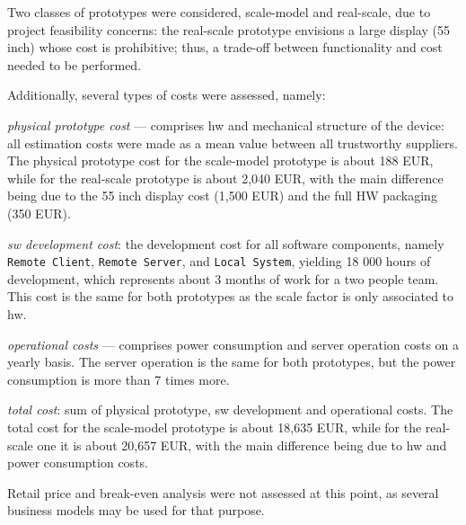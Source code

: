 Two classes of prototypes were considered, scale-model and real-scale,
due to project feasibility concerns: the real-scale prototype envisions a large
display (55 inch) whose cost is prohibitive; thus, a trade-off between
functionality and cost needed to be performed.

Additionally, several types of costs were assessed, namely:
\begin{item-c}
\item \emph{physical prototype cost} --- comprises \gls{hw} and mechanical structure of
  the device: all estimation costs were made as a mean value between all
  trustworthy suppliers.
The physical prototype cost for the scale-model prototype is about 188 EUR,
while for the real-scale prototype is about 2,040 EUR, with the main difference
being due to the 55 inch display cost (1,500 EUR) and the full HW packaging (350 EUR).
\item \emph{\gls{sw} development cost}: the development cost for all software
  components, namely \texttt{Remote Client}, \texttt{Remote Server}, and
  \texttt{Local System}, yielding 18 000 hours of development, which represents
  about 3 months of work for a two people team. This cost is the same for both
  prototypes as the scale factor is only associated to \gls{hw}.
\item \emph{operational costs} --- comprises power consumption and server
  operation costs on a yearly basis. The server operation is the same for both
  prototypes, but the power consumption is more than 7 times more.
\item \emph{total cost}: sum of physical prototype, \gls{sw} development and
  operational costs. The total cost for the scale-model prototype is about
  18,635 EUR, while for the real-scale one it is about 20,657 EUR, with the main
  difference being due to \gls{hw} and power consumption costs.
\end{item-c}

Retail price and break-even analysis were not assessed at this point, as several
business models may be used for that purpose.
%
% 
